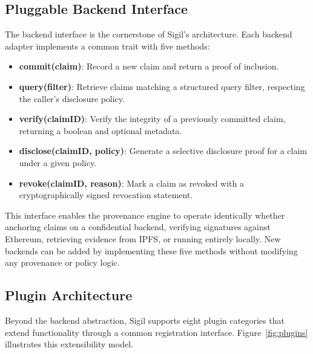 \documentclass[conference]{IEEEtran}
\begin{document}
\subsection{Pluggable Backend Interface}

The backend interface is the cornerstone of Sigil's architecture.  Each
backend adapter implements a common trait with five methods:

\begin{itemize}
  \item \textbf{commit(claim)}: Record a new claim and return a proof of
        inclusion.
  \item \textbf{query(filter)}: Retrieve claims matching a structured query
        filter, respecting the caller's disclosure policy.
  \item \textbf{verify(claimID)}: Verify the integrity of a previously
        committed claim, returning a boolean and optional metadata.
  \item \textbf{disclose(claimID, policy)}: Generate a selective disclosure
        proof for a claim under a given policy.
  \item \textbf{revoke(claimID, reason)}: Mark a claim as revoked with a
        cryptographically signed revocation statement.
\end{itemize}

This interface enables the provenance engine to operate identically whether
anchoring claims on a confidential backend, verifying signatures against Ethereum,
retrieving evidence from IPFS, or running entirely locally.  New backends can
be added by implementing these five methods without modifying any provenance
or policy logic.

\subsection{Plugin Architecture}

Beyond the backend abstraction, Sigil supports eight plugin categories that
extend functionality through a common registration interface.
Figure~\ref{fig:plugins} illustrates this extensibility model.
\end{document}
